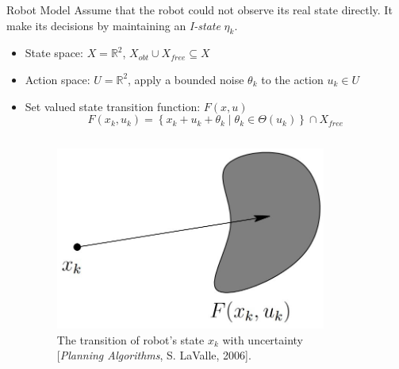 \documentclass[10pt]{beamer}
\begin{document}
\begin{frame}{Robot Model}
Assume that the robot could not observe its real state directly.  
It make its decisions by maintaining an \emph{I-state} $\eta_k$.
\begin{itemize}
\item State space: $X = \mathbb{R}^2$,  $X_{obt} \cup X_{free} \subseteq X$
\item Action space: $U = \mathbb{R}^2$, apply a bounded noise $\theta_k$ to the
  action $u_k \in U$
\item Set valued state transition function: $F(x, u)$
  \begin{equation}
    \label{eq:state-trans}
    F(x_k, u_k) = \left\{
      x_k + u_k + \theta_k
      \mid
      \theta_k \in \Theta(u_k)
    \right\} \cap X_{free}
  \end{equation}
  \begin{columns}
    \begin{column}{0.4\textwidth}
      \begin{figure}
        \centering
        \includegraphics[scale=0.2]{figs/istate.jpg}
        \caption{\scriptsize{The transition of robot's state $x_k$ with
            uncertainty [\emph{Planning Algorithms}, S. LaValle, 2006].}}
      \end{figure}
    \end{column}
    \begin{column}{0.5\textwidth}
      \begin{figure}
        \centering

\end{figure}
\end{column}
\end{columns}
\end{itemize}
\end{frame}
\end{document}
